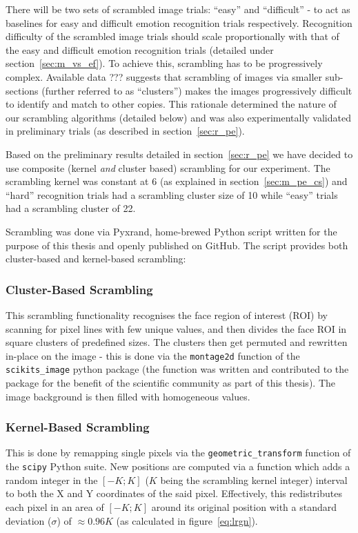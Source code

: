 	    There will be two sets of scrambled image trials: “easy” and “difficult” - to act as baselines for easy and difficult emotion recognition trials respectively.
	    Recognition difficulty of the scrambled image trials should scale proportionally with that of the easy and difficult emotion recognition trials (detailed under section~\ref{sec:m_vs_ef}).
	    To achieve this, scrambling has to be progressively complex.
	    Available data ??? suggests that scrambling of images via smaller sub-sections (further referred to as “clusters”) makes the images progressively difficult to identify and match to other copies.
	    This rationale determined the nature of our scrambling algorithms (detailed below) and was also experimentally validated in preliminary trials (as described in section~\ref{sec:r_pe}).
	    
	    Based on the preliminary results detailed in section~\ref{sec:r_pe} we have decided to use composite (kernel \textit{and} cluster based) scrambling for our experiment.
	    The scrambling kernel was constant at \SI{6}{\pixel} (as explained in section~\ref{sec:m_pe_cs}) 
	    and “hard” recognition trials had a scrambling cluster size of \SI{10}{\pixel} while “easy” trials had a scrambling cluster of \SI{22}{\pixel}.
	    
	    Scrambling was done via Pyxrand\cite{pyxrand}, home-brewed Python script written for the purpose of this thesis and openly published on GitHub.
	    The script provides both cluster-based and kernel-based scrambling:
	    \subsubsection{Cluster-Based Scrambling}
		This scrambling functionality recognises the face region of interest (ROI) by scanning for pixel lines with few unique values, and then divides the face ROI in square clusters of predefined sizes.
		The clusters then get permuted and rewritten in-place on the image - this is done via the \colorbox{vlg}{\texttt{montage2d}} function of the \colorbox{vlg}{\texttt{scikits\_image}} python package 
		(the function was written and contributed to the package for the benefit of the scientific community as part of this thesis).
		The image background is then filled with homogeneous values.
	    \subsubsection{Kernel-Based Scrambling}\label{sec:m_vs_si_kbs}
		This is done by remapping single pixels via the \colorbox{vlg}{\texttt{geometric\_transform}} function of the \colorbox{vlg}{\texttt{scipy}} Python suite. 
		New positions are computed via a function which adds a random integer in the $[-K;K]$ ($K$ being the scrambling kernel integer) interval to both the X and Y coordinates of the said pixel.
		Effectively, this redistributes each pixel in an area of $[-K;K]$ around its original position with a standard deviation ($\sigma$) of $\approx 0.96K$ (as calculated in figure~\ref{eq:lrgn}).
